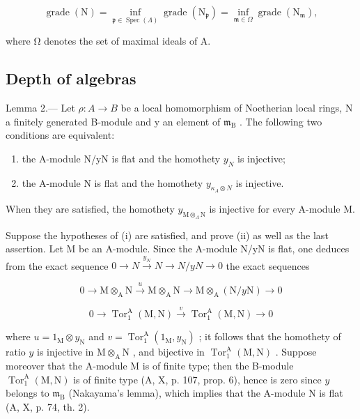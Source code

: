\[
\operatorname{grade} (\mathrm{N}) = \inf _ {\mathfrak {p} \in \operatorname{Spec} (\Lambda)} \operatorname{grade} \left(\mathrm{N} _ {\mathfrak {p}}\right) = \inf _ {\mathfrak {m} \in \Omega} \operatorname{grade} \left(\mathrm{N} _ {\mathfrak {m}}\right),
\]

where Ω denotes the set of maximal ideals of A.

\subsection{Depth of algebras}

Lemma 2.--- Let \(\rho: A \to B\) be a local homomorphism of Noetherian local rings, N a finitely generated B-module and y an element of \(\mathfrak{m}_{\mathrm{B}}\) . The following two conditions are equivalent:

\begin{enumerate}
\def\labelenumi{(\roman{enumi})}
\item
  the A-module N/yN is flat and the homothety \(y_{N}\) is injective;
\item
  the A-module N is flat and the homothety \(y_{\kappa_{A}\otimes N}\) is injective.
\end{enumerate}

When they are satisfied, the homothety \(y_{\mathrm{M} \otimes_{\Lambda}\mathrm{N}}\) is injective for every A-module M.

Suppose the hypotheses of (i) are satisfied, and prove (ii) as well as the last assertion. Let M be an A-module. Since the A-module N/yN is flat, one deduces from the exact sequence \(0 \rightarrow N \xrightarrow{y_{N}} N \longrightarrow N/yN \rightarrow 0\) the exact sequences

\[
0 \rightarrow \mathrm{M} \otimes_ {\mathrm{A}} \mathrm{N} \xrightarrow {u} \mathrm{M} \otimes_ {\mathrm{A}} \mathrm{N} \longrightarrow \mathrm{M} \otimes_ {\mathrm{A}} (\mathrm{N} / y \mathrm{N}) \rightarrow 0
\]

\[
0 \to \operatorname{Tor} _ {1} ^ {\mathrm{A}} (\mathrm{M}, \mathrm{N}) \stackrel {v} {\longrightarrow} \operatorname{Tor} _ {1} ^ {\mathrm{A}} (\mathrm{M}, \mathrm{N}) \to 0
\]

where \(u = 1_{\mathrm{M}} \otimes y_{\mathrm{N}}\) and \(v = \operatorname{Tor}_1^{\mathrm{A}}(1_{\mathrm{M}}, y_{\mathrm{N}})\) ; it follows that the homothety of ratio \(y\) is injective in \(\mathrm{M} \otimes_{\mathrm{A}} \mathrm{N}\) , and bijective in \(\operatorname{Tor}_1^{\mathrm{A}}(\mathrm{M}, \mathrm{N})\) . Suppose moreover that the A-module \(\mathrm{M}\) is of finite type; then the B-module \(\operatorname{Tor}_1^{\mathrm{A}}(\mathrm{M}, \mathrm{N})\) is of finite type (A, X, p. 107, prop. 6), hence is zero since \(y\) belongs to \(\mathfrak{m}_{\mathrm{B}}\) (Nakayama's lemma), which implies that the A-module \(\mathrm{N}\) is flat (A, X, p. 74, th. 2).

